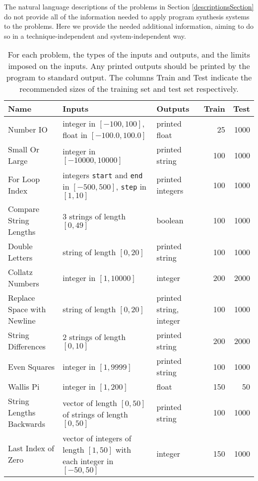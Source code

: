 \documentclass{sig-alternate}
\begin{document}
The natural language descriptions of the problems in Section \ref{descriptionsSection} do not provide all of the information needed to apply program synthesis systems to the problems. Here we provide the needed additional information, aiming to do so in a technique-independent and system-independent way.

\begin{table*}[t]
\centering
\caption{For each problem, the types of the inputs and outputs, and the limits imposed on the inputs. Any printed outputs should be printed by the program to standard output. The columns Train and Test indicate the recommended sizes of the training set and test set respectively.}
\label{testCasesTable}
\begin{tabular}{>{\raggedright}p{3.5cm}  >{\raggedright}p{7.4cm} l rr}
\toprule
\textbf{Name} & \textbf{Inputs} & \textbf{Outputs} & \textbf{Train} & \textbf{Test} \\
\midrule
Number IO & integer in $[-100, 100]$, float in $[-100.0, 100.0]$ & printed float & 25 & 1000 \\
Small Or Large & integer in $[-10000, 10000]$ & printed string & 100 & 1000 \\
For Loop Index & integers \texttt{start} and \texttt{end} in $[-500, 500]$, \texttt{step} in $[1, 10]$ & printed integers & 100 & 1000 \\
Compare String Lengths & 3 strings of length $[0, 49]$ & boolean & 100 & 1000 \\
Double Letters & string of length $[0, 20]$ & printed string & 100 & 1000 \\
Collatz Numbers & integer in $[1, 10000]$ & integer & 200 & 2000 \\
Replace Space with Newline & string of length $[0, 20]$ & printed string, integer & 100 & 1000 \\
String Differences & 2 strings of length $[0, 10]$ & printed string & 200 & 2000 \\
Even Squares & integer in $[1, 9999]$ & printed string & 100 & 1000 \\
Wallis Pi & integer in $[1, 200]$ & float & 150 & 50 \\
String Lengths Backwards & vector of length $[0, 50]$ of strings of length $[0, 50]$ & printed string & 100 & 1000 \\
Last Index of Zero & vector of integers of length $[1, 50]$ with each integer in $[-50, 50]$ & integer & 150 & 1000 \\

\end{tabular}
\end{table*}
\end{document}
